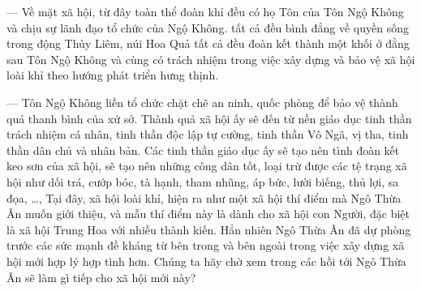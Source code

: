 — Về mặt xã hội, từ đây toàn thể đoàn khỉ đều có họ Tôn của Tôn Ngộ Không và chịu sự lãnh đạo tổ chức của Ngộ Không. tất cả đều bình đẳng về quyền sống trong động Thủy Liêm, núi Hoa Quả tất cả đều đoàn kết thành một khối ở đằng sau Tôn Ngộ Không và cùng có trách nhiệm trong việc xây dựng và bảo vệ xã hội loài khỉ theo hướng phát triển hưng thịnh.

— Tôn Ngộ Không liền tổ chức chặt chẽ an ninh, quốc phòng để bảo vệ thành quả thanh bình của xứ sở. Thành quả xã hội ấy sẽ đến từ nền giáo dục tinh thần trách nhiệm cá nhân, tinh thần độc lập tự cường, tinh thần Vô Ngã, vị tha, tinh thần dân chủ và nhân bản. Các tinh thần giáo dục ấy sẽ tạo nên tình đoàn kết keo sơn của xã hội, sẽ tạo nên những công dân tốt, loại trừ được các tệ trạng xã hội như dối trá, cướp bóc, tà hạnh, tham nhũng, áp bức, lười biếng, thủ lợi, sa đọa, \ldots, Tại đây, xã hội loài khỉ, hiện ra như một xã hội thí điểm mà Ngô Thừa Ân muốn giới thiệu, và mẫu thí điểm này là dành cho xã hội con Người, đặc biệt là xã hội Trung Hoa với nhiều thành kiến. Hẳn nhiên Ngô Thừa Ân đã dự phòng trước các sức mạnh đề kháng từ bên trong và bên ngoài trong việc xây dựng xã hội mới hợp lý hợp tình hơn. Chúng ta hãy chờ xem trong các hồi tới Ngô Thừa Ân sẽ làm gì tiếp cho xã hội mới này?
